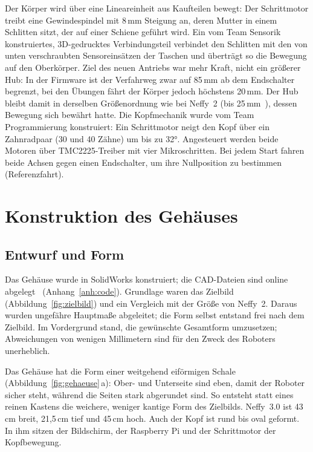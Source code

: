 Der Körper wird über eine Lineareinheit aus Kaufteilen bewegt: Der Schrittmotor treibt eine
Gewindespindel mit 8\,mm Steigung an, deren Mutter in einem Schlitten sitzt, der auf einer
Schiene geführt wird. Ein vom Team Sensorik konstruiertes, 3D-gedrucktes Verbindungsteil verbindet den
Schlitten mit den von unten verschraubten Sensoreinsätzen der Taschen und überträgt so die
Bewegung auf den Oberkörper. Ziel des neuen Antriebs war mehr Kraft, nicht ein größerer Hub:
In der Firmware ist der Verfahrweg zwar auf 85\,mm ab dem Endschalter begrenzt, bei den Übungen
fährt der Körper jedoch höchstens 20\,mm. Der Hub bleibt damit in derselben Größenordnung wie
bei Neffy~2 (bis 25\,mm~\cite{goerke2025neffy2}), dessen Bewegung sich bewährt hatte.
Die Kopfmechanik wurde vom Team Programmierung konstruiert: Ein Schrittmotor
neigt den Kopf über ein Zahnradpaar (30 und 40 Zähne) um bis zu 32°. Angesteuert werden beide
Motoren über
TMC2225-Treiber mit vier Mikroschritten. Bei jedem Start fahren beide Achsen gegen einen
Endschalter, um ihre Nullposition zu bestimmen (Referenzfahrt).

\section{Konstruktion des Gehäuses}
\label{sec:gehaeuse}

\subsection{Entwurf und Form}
\label{sec:gehaeuse_form}

Das Gehäuse wurde in SolidWorks konstruiert; die CAD-Dateien sind online
abgelegt~\cite{werk2026cad} (Anhang~\ref{anh:code}). Grundlage waren das Zielbild
(Abbildung~\ref{fig:zielbild}) und ein Vergleich mit der Größe von Neffy~2. Daraus wurden
ungefähre Hauptmaße abgeleitet; die Form selbst entstand frei nach dem Zielbild. Im Vordergrund
stand, die gewünschte Gesamtform umzusetzen; Abweichungen von wenigen Millimetern sind für den
Zweck des Roboters unerheblich.

Das Gehäuse hat die Form einer weitgehend eiförmigen Schale (Abbildung~\ref{fig:gehaeuse}\,a):
Ober- und Unterseite sind eben, damit der Roboter sicher steht, während die Seiten stark
abgerundet sind. So entsteht statt eines reinen Kastens die weichere, weniger kantige Form des
Zielbilds. Neffy~3.0 ist 43\,cm breit, 21{,}5\,cm tief und 45\,cm hoch. Auch
der Kopf ist rund bis oval geformt. In ihm sitzen der Bildschirm, der Raspberry Pi und der
Schrittmotor der Kopfbewegung.

